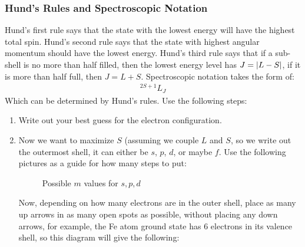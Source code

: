 \subsubsection{Hund's Rules and Spectroscopic Notation}
Hund's first rule says that the state with the lowest energy will have the highest total spin. Hund's second rule says that the state with highest angular momentum should have the lowest energy. Hund's third rule says that if a sub-shell is no more than half filled, then the lowest energy level has $J=\abs{L-S}$, if it is more than half full, then $J=L+S$. Spectroscopic notation takes the form of:
\begin{align*}
  ^{2S+1}L_{J}
\end{align*}
Which can be determined by Hund's rules. Use the following steps:
\begin{enumerate}
\item Write out your best guess for the electron configuration.
\item Now we want to maximize $S$ (assuming we couple $L$ and $S$, so we write out the outermost shell, it can either be $s$, $p$, $d$, or maybe $f$. Use the following pictures as a guide for how many steps to put:
  \begin{figure}[H]
    \centering
    \caption{Possible $m$ values for $s,p,d$}
  \end{figure}
  Now, depending on how many electrons are in the outer shell, place as many up arrows in as many open spots as possible, without placing any down arrows, for example, the Fe atom ground state has $6$ electrons in its valence shell, so this diagram will give the following:
  \begin{figure}[H]
    \centering
\end{figure}
\end{enumerate}
